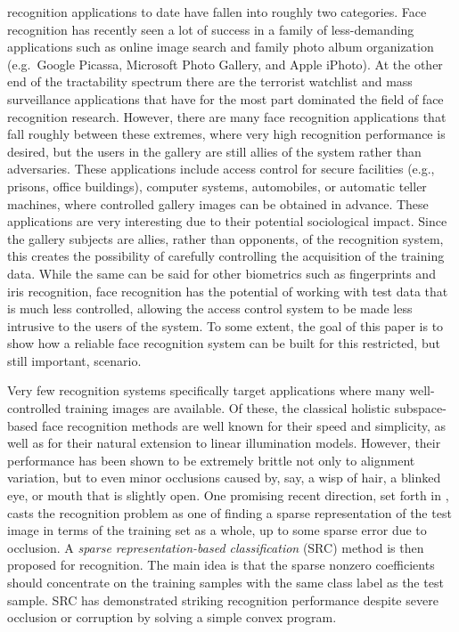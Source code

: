 \documentclass[10pt,journal,letterpaper,compsoc]{IEEEtran} %
\begin{document}
 recognition applications to date have fallen into roughly two
categories.  Face recognition has recently seen a lot of success in a family of
less-demanding applications such as online image search and family photo album
organization (e.g.\ Google Picassa, Microsoft Photo Gallery, and Apple iPhoto).
At the other end of the tractability spectrum there are the terrorist watchlist
and mass surveillance applications that have for the most part dominated the
field of face recognition research.  However, there are many face recognition
applications that fall roughly between these extremes, where very high recognition
performance is desired, but the users in the gallery are still allies of the
system rather than adversaries.  These applications include access control for
secure facilities (e.g., prisons, office buildings), computer systems,
automobiles, or automatic teller machines, where controlled gallery images can
be obtained in advance.  These applications are very interesting due to their
potential sociological impact.  Since the gallery subjects are allies, rather
than opponents, of the recognition system, this creates the possibility of
carefully controlling the acquisition of the training data. While the same can
be said for other biometrics such as fingerprints and iris recognition, face
recognition has the potential of working with test data that is much less
controlled, allowing the access control system to be made less intrusive to the
users of the system. To some extent, the goal of this paper is to show how a
reliable face recognition system can be built for this restricted,
but still important, scenario.

Very few recognition systems specifically target applications where many well-
controlled training images are available.  Of these, the classical holistic
subspace-based face recognition methods \cite{Turk1991-CVPR,Belhumeur1997-PAMI}
are well known for their speed and simplicity, as well as for their natural
extension to linear illumination models.  However, their performance has been
shown to be extremely brittle not only to alignment variation, but to even
minor occlusions caused by, say, a wisp of hair, a blinked eye, or mouth that
is slightly open. One promising recent direction, set forth in
\cite{Wright2009-PAMI}, casts the recognition problem as one of finding a
sparse representation of the test image in terms of the training set as a
whole, up to some sparse error due to occlusion. A \emph{sparse
representation-based classification} (SRC) method is then proposed for
recognition. The main idea is that the sparse nonzero coefficients should
concentrate on the training samples with the same class label as the test
sample. SRC has demonstrated striking recognition performance despite severe
occlusion or corruption by solving a simple convex program.
\end{document}
